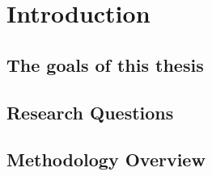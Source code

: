 \chapter{Introduction} \label{intro}

\section{The goals of this thesis} \label{goals}

\section{Research Questions} \label{rq}

\section{Methodology Overview} \label{meth}


